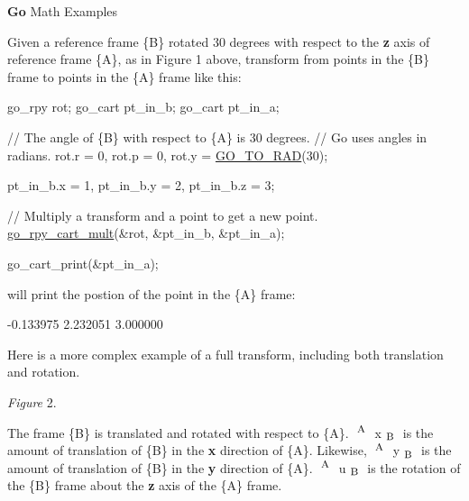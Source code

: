 {\bfseries Go} Math Examples

Given a reference frame \{B\} rotated 30 degrees with respect to the {\bfseries z} axis of reference frame \{A\}, as in Figure 1 above, transform from points in the \{B\} frame to points in the \{A\} frame like this\-: 
\begin{DoxyCode}
go\_rpy rot;
go\_cart pt\_in\_b;
go\_cart pt\_in\_a;

\textcolor{comment}{// The angle of \{B\} with respect to \{A\} is 30 degrees.}
\textcolor{comment}{// Go uses angles in radians.}
rot.r = 0, rot.p = 0, rot.y = \hyperlink{gomath_8h_a257fd1bdbb4294c1bf1d2c34bfeaba42}{GO\_TO\_RAD}(30);

pt\_in\_b.x = 1, pt\_in\_b.y = 2, pt\_in\_b.z = 3;

\textcolor{comment}{// Multiply a transform and a point to get a new point.}
\hyperlink{namespacegomotion_ac89b091b7958b0916f0bfffc89022751}{go\_rpy\_cart\_mult}(&rot, &pt\_in\_b, &pt\_in\_a);

go\_cart\_print(&pt\_in\_a);
\end{DoxyCode}
 will print the postion of the point in the \{A\} frame\-: 
\begin{DoxyCode}
-0.133975 2.232051 3.000000
\end{DoxyCode}
 Here is a more complex example of a full transform, including both translation and rotation.  \begin{center}{\itshape Figure} 2.\end{center} 

The frame \{B\} is translated and rotated with respect to \{A\}. $^{\mbox{
\footnotesize A
\normalsize }}$ x$_{\mbox{
\footnotesize B
\normalsize }}$  is the amount of translation of \{B\} in the {\bfseries x} direction of \{A\}. Likewise, $^{\mbox{
\footnotesize A
\normalsize }}$ y$_{\mbox{
\footnotesize B
\normalsize }}$  is the amount of translation of \{B\} in the {\bfseries y} direction of \{A\}. $^{\mbox{
\footnotesize A
\normalsize }}$ u$_{\mbox{
\footnotesize B
\normalsize }}$  is the rotation of the \{B\} frame about the {\bfseries z} axis of the \{A\} frame.


